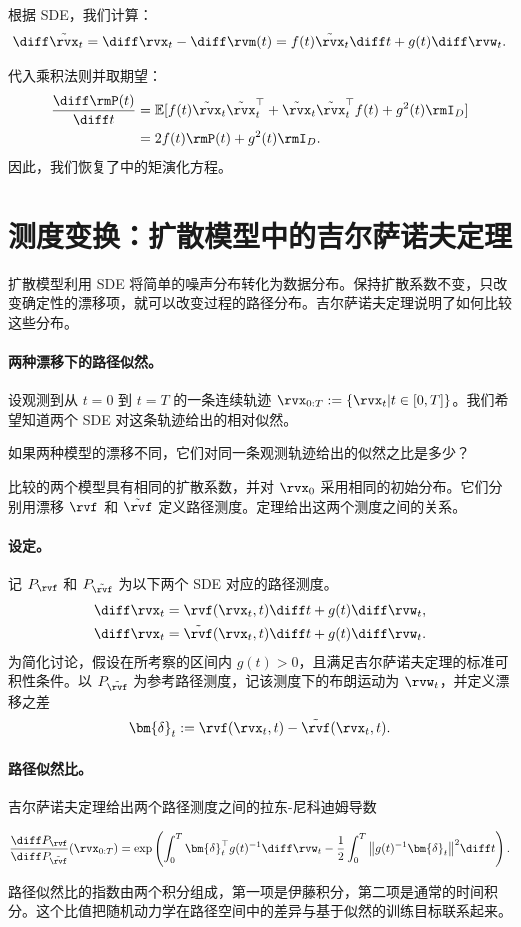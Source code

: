 根据 SDE，我们计算：
\[
\diff \tilde{\rvx}_t = \diff \rvx_t - \diff \rvm(t) = f(t) \tilde{\rvx}_t  \diff t + g(t)  \diff \rvw_t.
\]

代入乘积法则并取期望：
\begin{align*}
    \frac{\diff \rmP(t)}{\diff t}
    &= \mathbb{E}[f(t) \tilde{\rvx}_t \tilde{\rvx}_t^\top + \tilde{\rvx}_t \tilde{\rvx}_t^\top f(t) + g^2(t) \rmI_D] \\
    &= 2 f(t) \rmP(t) + g^2(t) \rmI_D.
\end{align*}
因此，我们恢复了中的矩演化方程。


\section{测度变换：扩散模型中的吉尔萨诺夫定理}
扩散模型利用 SDE 将简单的噪声分布转化为数据分布。保持扩散系数不变，只改变确定性的漂移项，就可以改变过程的路径分布。吉尔萨诺夫定理说明了如何比较这些分布。

\paragraph{两种漂移下的路径似然。}
设观测到从 $t=0$ 到 $t=T$ 的一条连续轨迹 $\rvx_{0:T}:=\{ \rvx_t|t \in [0,T] \}$。我们希望知道两个 SDE 对这条轨迹给出的相对似然。
\begin{question}
    如果两种模型的漂移不同，它们对同一条观测轨迹给出的似然之比是多少？
\end{question}
比较的两个模型具有相同的扩散系数，并对 $\rvx_0$ 采用相同的初始分布。它们分别用漂移 $\rvf$ 和 $\tilde{\rvf}$ 定义路径测度。定理给出这两个测度之间的关系。

\paragraph{设定。}
记 $P_{\rvf}$ 和 $P_{\tilde{\rvf}}$ 为以下两个 SDE 对应的路径测度。
\begin{align*}
    \diff\rvx_t
    &= \rvf(\rvx_t,t)\diff t + g(t)\diff\rvw_t,
    \\
    \diff\rvx_t
    &= \tilde{\rvf}(\rvx_t,t)\diff t + g(t)\diff\rvw_t.
\end{align*}
为简化讨论，假设在所考察的区间内 $g(t)>0$，且满足吉尔萨诺夫定理的标准可积性条件。以 $P_{\tilde{\rvf}}$ 为参考路径测度，记该测度下的布朗运动为 $\rvw_t$，并定义漂移之差
\[
\bm{\delta}_t
:=
\rvf(\rvx_t,t)-\tilde{\rvf}(\rvx_t,t).
\]

\paragraph{路径似然比。}
吉尔萨诺夫定理给出两个路径测度之间的拉东-尼科迪姆导数
\begin{mdframed}
\[
\frac{\diff P_{\rvf}}{\diff P_{\tilde{\rvf}}}(\rvx_{0:T})
=
\exp\left(
\int_0^T
\bm{\delta}_t^\top g(t)^{-1}\diff\rvw_t
-
\frac{1}{2}
\int_0^T
\big\|g(t)^{-1}\bm{\delta}_t\big\|^2
\diff t
\right).
\]
\end{mdframed}
路径似然比的指数由两个积分组成，第一项是伊藤积分，第二项是通常的时间积分。这个比值把随机动力学在路径空间中的差异与基于似然的训练目标联系起来。


